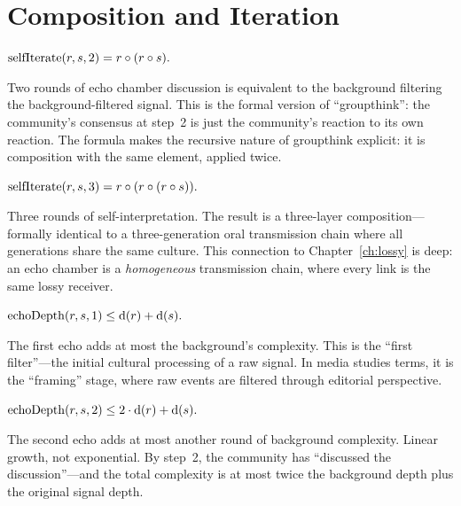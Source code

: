 \section{Composition and Iteration}
\label{sec:echo-composition}

\begin{theorem}[Two-Step Echo = Single Compound Step (9.10)]
\label{thm:two-step-echo}
$\mathrm{selfIterate}(r, s, 2) = r\circ(r\circ s).$
\end{theorem}

Two rounds of echo chamber discussion is equivalent to the background
filtering the background-filtered signal.  This is the formal version of
``groupthink'': the community's consensus at step~2 is just the community's
reaction to its own reaction.  The formula makes the recursive nature of
groupthink explicit: it is composition with the same element, applied twice.

\begin{theorem}[Three-Step Echo = Triple Composition (9.11)]
\label{thm:three-step-echo}
$\mathrm{selfIterate}(r, s, 3) = r\circ(r\circ(r\circ s)).$
\end{theorem}

Three rounds of self-interpretation.  The result is a three-layer
composition---formally identical to a three-generation oral transmission
chain where all generations share the same culture.  This connection to
Chapter~\ref{ch:lossy} is deep: an echo chamber is a \emph{homogeneous}
transmission chain, where every link is the same lossy receiver.

\begin{theorem}
\label{thm:echo-step1}
$\mathrm{echoDepth}(r, s, 1) \le \operatorname{d}(r) + \operatorname{d}(s).$
\end{theorem}

The first echo adds at most the background's complexity.  This is the
``first filter''---the initial cultural processing of a raw signal.  In
media studies terms, it is the ``framing'' stage, where raw events are
filtered through editorial perspective.

\begin{theorem}
\label{thm:echo-step2}
$\mathrm{echoDepth}(r, s, 2) \le 2\cdot\operatorname{d}(r) + \operatorname{d}(s).$
\end{theorem}

The second echo adds at most another round of background complexity.  Linear
growth, not exponential.  By step~2, the community has ``discussed the
discussion''---and the total complexity is at most twice the background
depth plus the original signal depth.


